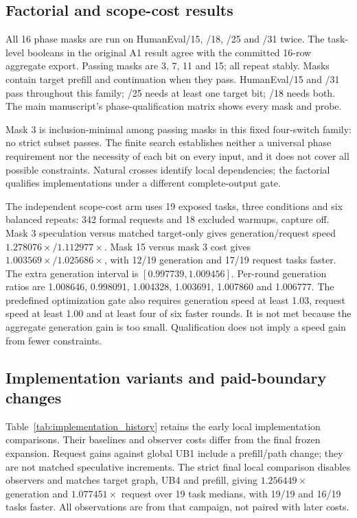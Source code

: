 \subsection{Factorial and scope-cost results}
\label{supp:phase_factorial}
All 16 phase masks are run on HumanEval/15, /18, /25 and /31 twice. The task-level booleans in the original A1 result agree with the committed 16-row aggregate export. Passing masks are 3, 7, 11 and 15; all repeat stably. Masks contain target prefill and continuation when they pass. HumanEval/15 and /31 pass throughout this family; /25 needs at least one target bit; /18 needs both. The main manuscript's phase-qualification matrix shows every mask and probe.

Mask 3 is inclusion-minimal among passing masks in this fixed four-switch family: no strict subset passes. The finite search establishes neither a universal phase requirement nor the necessity of each bit on every input, and it does not cover all possible constraints. Natural crosses identify local dependencies; the factorial qualifies implementations under a different complete-output gate.

The independent scope-cost arm uses 19 exposed tasks, three conditions and six balanced repeats: 342 formal requests and 18 excluded warmups, capture off. Mask 3 speculation versus matched target-only gives generation/request speed $1.278076\times/1.112977\times$. Mask 15 versus mask 3 cost gives $1.003569\times/1.025686\times$, with 12/19 generation and 17/19 request tasks faster. The extra generation interval is $[0.997739,1.009456]$. Per-round generation ratios are 1.008646, 0.998091, 1.004328, 1.003691, 1.007860 and 1.006777. The predefined optimization gate also requires generation speed at least 1.03, request speed at least 1.00 and at least four of six faster rounds. It is not met because the aggregate generation gain is too small. Qualification does not imply a speed gain from fewer constraints.

\subsection{Implementation variants and paid-boundary changes}
\label{supp:implementation_variants}
Table~\ref{tab:implementation_history} retains the early local implementation comparisons. Their baselines and observer costs differ from the final frozen expansion. Request gains against global UB1 include a prefill/path change; they are not matched speculative increments. The strict final local comparison disables observers and matches target graph, UB4 and prefill, giving $1.256449\times$ generation and $1.077451\times$ request over 19 task medians, with 19/19 and 16/19 tasks faster. All observations are from that campaign, not paired with later costs.


